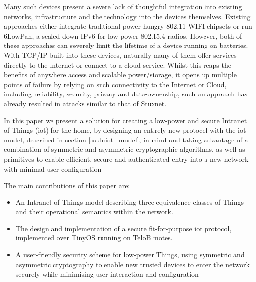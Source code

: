 \documentclass[conference]{./sty/IEEEtran}
\begin{document}
Many such devices present a severe lack of thoughtful integration into existing networks, infrastructure and the technology into the devices themselves. Existing approaches either integrate traditional power-hungry 802.11 WIFI chipsets or run 6LowPan, a scaled down IPv6 for low-power 802.15.4 radios. However, both of these approaches can severely limit the lifetime of a device running on batteries. With TCP/IP built into these devices, naturally many of them offer services directly to the Internet\cite{MQTT,IETF_CORE,Xively} or connect to a cloud service\cite{SmartThings,Twine}. Whilst this reaps the benefits of anywhere access and scalable power/storage, it opens up multiple points of failure by relying on such connectivity to the Internet or Cloud, including reliability, security, privacy and data-ownership; such an approach has already resulted in attacks similar to that of Stuxnet\cite{IoTWorm}.

In this paper we present a solution for creating a low-power and secure Intranet of Things (iot) for the home, by designing an entirely new protocol with the iot model, described in section \ref{ssub:iot_model}, in mind and taking advantage of a combination of symmetric and asymmetric cryptographic algorithms, as well as primitives to enable efficient, secure and authenticated entry into a new network with minimal user configuration.


The main contributions of this paper are:
\begin{itemize}
  \item An Intranet of Things model describing three equivalence classes of Things and their operational semantics within the network.
  \item The design and implementation of a secure fit-for-purpose iot protocol, implemented over TinyOS running on TeloB motes.
  \item A user-friendly security scheme for low-power Things, using symmetric and asymmetric cryptography to enable new trusted devices to enter the network securely while minimising user interaction and configuration  
\end{itemize}
\end{document}
